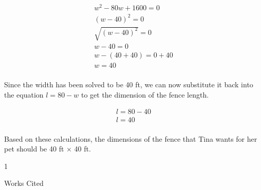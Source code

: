 \documentclass[12pt]{article}
\newenvironment{workscited}{\newpage \begin{center} Works Cited \end{center}}{\newpage }
\begin{document}
\begin{flushleft}
\par
\begin{align}
  w^2 - 80w + 1600 = 0 \\
  (w - 40)^2 = 0 \\
  \sqrt{(w-40)^2} = 0 \\
  w - 40 = 0 \\
  w - (40 + 40) = 0 + 40 \\
  w = 40 \\
\end{align}
\par
Since the width has been solved to be 40 ft, we can now substitute it back into the equation $ l = 80 - w $ to get the dimension of the fence length.
\par
\begin{align}
  l = 80 - 40 \\
  l = 40 \\
\end{align}
\par
Based on these calculations, the dimensions of the fence that Tina wants for her pet should be 40 ft $ \times $ 40 ft.
\begin{center}

\end{center}


\setlength{\parindent}{0.5in}

1

\begin{workscited}


\end{workscited}

\end{flushleft}
\end{document}
